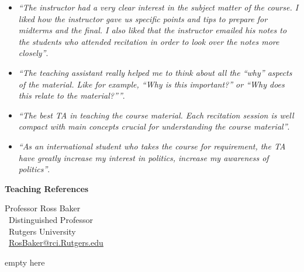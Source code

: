 \documentclass[11pt]{letter} %
\begin{document}
\begin{letter}{}
\begin{itemize}
\item \emph{``The instructor had a very clear interest in the subject matter of the course. I liked how the instructor gave us specific points and tips to prepare for midterms and the final. I also liked that the instructor emailed his notes to the students who attended recitation in order to look over the notes more closely''}.

\item \emph{``The teaching assistant really helped me to think about all the ``why'' aspects of the material. Like for example, ``Why is this important?'' or ``Why does this relate to the material?''''}.

\item \emph{``The best TA in teaching the course material. Each recitation session is well compact with main concepts crucial for understanding the course material''}.

\item \emph{``As an international student who takes the course for requirement, the TA have greatly increase my interest in politics, increase my awareness of politics''}.

\end{itemize}


{\bf Teaching References}

Professor Ross Baker\\\
Distinguished Professor\\\
Rutgers University\\\
\href{mailto:rosbaker@rci.rutgers.edu}{RosBaker@rci.Rutgers.edu} 



\closing{{\color{white}empty here}}




\end{letter}
\end{document}
